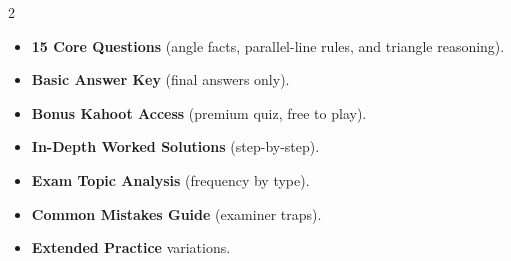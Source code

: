 \documentclass[11pt,a4paper]{article}
\newcommand{\FullReleaseDate}{April 30, 2026}
\begin{document}
\vspace{8pt}

\begin{multicols}{2}
  \begin{tcolorbox}[card, title=\sffamily\bfseries\textcolor{white}{\faHandPointDown\ TODAY (Simplified Version)}, colbacktitle=mainblue, boxed title style={sharp corners, boxrule=0pt}]
    \begin{itemize}[leftmargin=1.2em, itemsep=2pt]
      \item \small \textbf{15 Core Questions} (angle facts, parallel-line rules, and triangle reasoning).
      \item \small \textbf{Basic Answer Key} (final answers only).
      \item \small \textbf{Bonus Kahoot Access} (premium quiz, free to play).
    \end{itemize}
  \end{tcolorbox}

  \columnbreak

  \begin{tcolorbox}[card, title=\sffamily\bfseries\textcolor{white}{\faRocket\ ON \FullReleaseDate\ (Full Upgrade)}, colbacktitle=mainblue, boxed title style={sharp corners, boxrule=0pt}]
    \begin{itemize}[leftmargin=1.2em, itemsep=2pt]
      \item \small \textbf{In-Depth Worked Solutions} (step-by-step).
      \item \small \textbf{Exam Topic Analysis} (frequency by type).
      \item \small \textbf{Common Mistakes Guide} (examiner traps).
      \item \small \textbf{Extended Practice} variations.
    \end{itemize}
  \end{tcolorbox}
\end{multicols}
\end{document}
